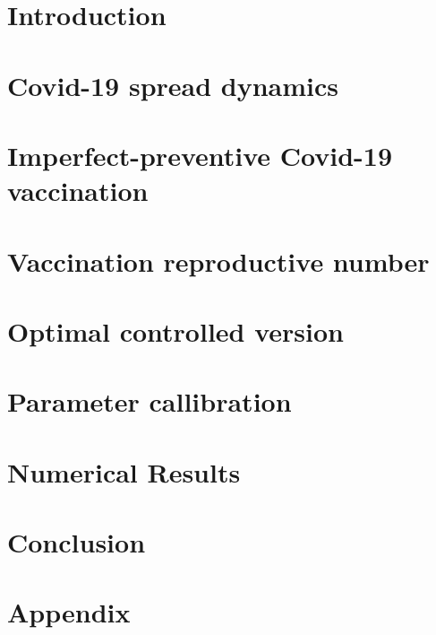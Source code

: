\documentclass[3p, sort&compress]{elsarticle}
\begin{document}
  
  \section{Introduction}
    
  \section{Covid-19 spread dynamics}
    
  \section{Imperfect-preventive Covid-19 vaccination}
    
  \section{Vaccination reproductive number}
    
    
  \section{Optimal controlled version}
    
  \section{Parameter callibration}
    
  \section{Numerical Results}   
  \section{Conclusion}
  \appendix
  \section{Appendix}
    
  \nocite{*}
  
  
\end{document}
